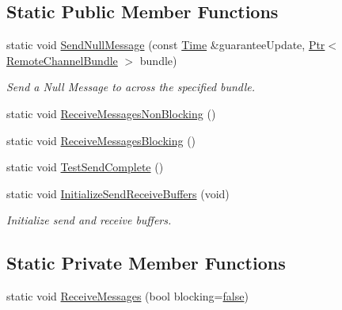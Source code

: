 \subsection*{Static Public Member Functions}
\begin{DoxyCompactItemize}
\item 
static void \hyperlink{classns3_1_1NullMessageMpiInterface_a92aad3a1cd808f9434cb231887f830de}{Send\+Null\+Message} (const \hyperlink{classns3_1_1Time}{Time} \&guarantee\+Update, \hyperlink{classns3_1_1Ptr}{Ptr}$<$ \hyperlink{classns3_1_1RemoteChannelBundle}{Remote\+Channel\+Bundle} $>$ bundle)
\begin{DoxyCompactList}\small\item\em Send a Null Message to across the specified bundle. \end{DoxyCompactList}\item 
static void \hyperlink{classns3_1_1NullMessageMpiInterface_a72b804a0df5b1a3b5f992c04e62e63c5}{Receive\+Messages\+Non\+Blocking} ()
\item 
static void \hyperlink{classns3_1_1NullMessageMpiInterface_a1fa1c0d0803d3aad54f54e05b361ac6f}{Receive\+Messages\+Blocking} ()
\item 
static void \hyperlink{classns3_1_1NullMessageMpiInterface_a97d3958578fd342a456baf86d8f956ab}{Test\+Send\+Complete} ()
\item 
static void \hyperlink{classns3_1_1NullMessageMpiInterface_ab678abc12a3e689d5eeeaee743b51c11}{Initialize\+Send\+Receive\+Buffers} (void)
\begin{DoxyCompactList}\small\item\em Initialize send and receive buffers. \end{DoxyCompactList}\end{DoxyCompactItemize}
\subsection*{Static Private Member Functions}
\begin{DoxyCompactItemize}
\item 
static void \hyperlink{classns3_1_1NullMessageMpiInterface_a9ca96f3f6dc2df5f955505c441499430}{Receive\+Messages} (bool blocking=\hyperlink{lte__cqi__generation_8m_ab1bef239d413c4da139c4bac92cd657a}{false})
\end{DoxyCompactItemize}
